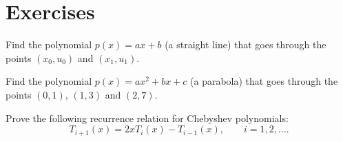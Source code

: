 \section{Exercises}
\begin{exercise}
    Find the polynomial $p(x) = ax + b$ (a straight line) that goes through the points $(x_0, u_0)$ and $(x_1, u_1)$.
\end{exercise}

\begin{exercise}
    Find the polynomial $p(x) = ax^2 + b x + c$ (a parabola) that goes through the points $(0, 1)$, $(1, 3)$ and $(2, 7)$.
\end{exercise}

\begin{exercise}
    Prove the following recurrence relation for Chebyshev polynomials:
    \[
        T_{i+1}(x) = 2 x T_i(x) - T_{i-1}(x), \qquad i = 1, 2, \dotsc.
    \]
\end{exercise}

